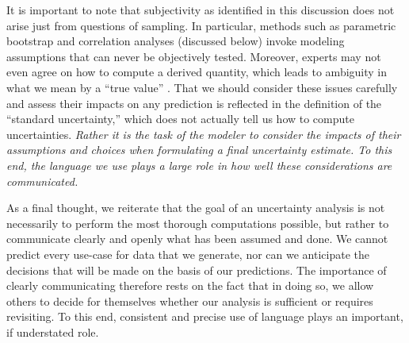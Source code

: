 It is important to note that subjectivity as identified in this discussion does not arise just from questions of sampling. In particular, methods such as parametric bootstrap and correlation analyses (discussed below) invoke modeling assumptions that can never be objectively tested.  Moreover, experts may not even agree on how to compute a derived quantity, which leads to ambiguity in what we mean by a ``true value'' \cite{patrone1}.  That we should consider these issues carefully and assess their impacts on any prediction is reflected in the definition of the ``standard uncertainty,'' which does not actually tell us how to compute uncertainties.  {\it Rather it is the task of the modeler to consider the impacts of their assumptions and choices when formulating a final uncertainty estimate.  To this end, the language we use plays a large role in how well these considerations are communicated.}

As a final thought, we reiterate that the goal of an uncertainty analysis is not necessarily to perform the most thorough computations possible, but rather to communicate clearly and openly what has been assumed and done.  We cannot predict every use-case for data that we generate, nor can we anticipate the decisions that will be made on the basis of our predictions.  The importance of clearly communicating therefore rests on the fact that in doing so, we allow others to decide for themselves whether our analysis is sufficient or requires revisiting.  To this end, consistent and precise use of language plays an important, if understated role.
